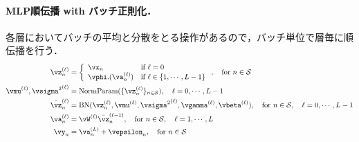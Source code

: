 \paragraph{MLP順伝播 with バッチ正則化．}
各層においてバッチの平均と分散をとる操作があるので，バッチ単位で層毎に順伝播を行う．
\begin{align*}
 \vz^{(\ell)}_n &=
 \left\{
     \begin{array}{ll}
       \vx_n & \mbox{if }\ell=0 \\
       \vphi.(\va^{(\ell)}_n) & \mbox{if }\ell \in \{1,\cdots,L-1 \}
     \end{array}
   \right.
   ,~~~\mbox{for }n\in\mathcal{S}
   \\
\vmu^{(\ell)}, {\vsigma^2}^{(\ell)} &= \mbox{NormParam}(\{\vz^{(\ell)}_{n}\}_{n\in\mathcal{S}}),~~~\ell=0,\cdots,L-1
\\
\bar{\vz}^{(\ell)}_{n}
&=
\mbox{BN}(\vz^{(\ell)}_n,\vmu^{(\ell)}, {\vsigma^2}^{(\ell)},\vgamma^{(\ell)},\vbeta^{(\ell)}),~~~\mbox{for }n\in\mathcal{S},~~~\ell=0,\cdots,L-1
\\
 \va^{(\ell)}_n &= \vW^{(\ell)}\bar{\vz}^{(\ell-1)}_n,~~~\mbox{for } n\in\mathcal{S},~~~\ell=1,\cdots,L
 \\
 \vy_n &= \va^{(L)}_n + \vepsilon_n,~~~\mbox{for } n\in\mathcal{S}
\end{align*}


